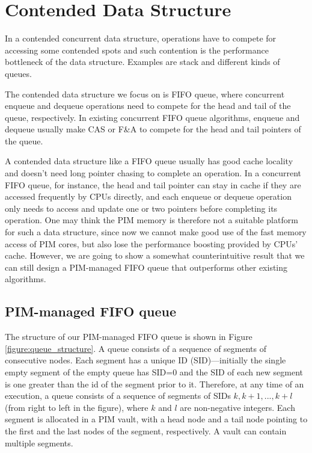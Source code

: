 \documentclass[11pt, letterpaper]{article}   	%
\begin{document}
\section{Contended Data Structure}
\label{section:contended}
In a contended concurrent data structure, operations have to compete for
accessing some contended spots and
such contention is the performance bottleneck of the data structure.
Examples are stack and different kinds of queues.

The contended data structure we focus on is FIFO queue, where concurrent enqueue
and dequeue operations need to compete for the head and tail of the queue, respectively.
In existing concurrent FIFO queue algorithms, enqueue and dequeue usually
make CAS or F\&A to compete for the head and tail pointers of the queue.

A contended data structure like a FIFO queue usually has good cache locality
and doesn't need long pointer chasing to complete an operation.
In a concurrent FIFO queue, for instance, the head and tail pointer can stay in
cache if they are accessed frequently by CPUs directly, and each enqueue or dequeue
operation only needs to access and update one or two pointers before completing its operation.
One may think the PIM memory is therefore not a suitable platform for such a data structure,
since now we cannot make good use of the fast memory access of PIM cores, but also
lose the performance boosting provided by CPUs' cache.
However, we are going to show a somewhat counterintuitive result that we can still design
a PIM-managed FIFO queue that outperforms other existing algorithms.

\subsection{PIM-managed FIFO queue}
The structure of our PIM-managed FIFO queue is shown in Figure \ref{figure:queue_structure}.
A queue consists of a sequence of segments of consecutive nodes.
Each segment has a unique ID (SID)---initially the single empty segment of the empty queue has SID=0
and the SID of each new segment is one greater than the id of the segment prior to it.
Therefore, at any time of an execution, a queue consists of a sequence of segments of
SIDs $k, k+1,..., k+l$ (from right to left in the figure), where $k$ and $l$ are non-negative integers.
Each segment is allocated in a PIM vault, with a head node and a tail node pointing to
the first and the last nodes of the segment, respectively.
A vault can contain multiple segments. 
\end{document}

